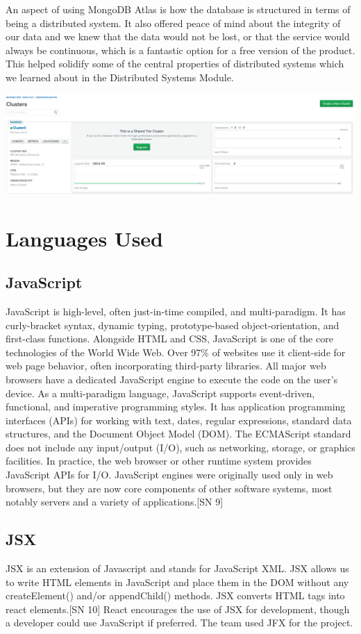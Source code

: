 An aspect of using MongoDB Atlas is how the database is structured in terms of being a distributed system. It also offered peace of mind about the integrity of our data and we knew that the data would not be lost, or that the service would always be continuous, which is a fantastic option for a free version of the product. 
This helped solidify  some of the central properties of distributed systems which we learned about in the Distributed Systems Module.
\begin{center}    
      \includegraphics[scale=0.5]{img/clusterDB.PNG}
\end{center}

\section{Languages Used}
\subsection{JavaScript}
JavaScript is high-level, often just-in-time compiled, and multi-paradigm. It has curly-bracket syntax, dynamic typing, prototype-based object-orientation, and first-class functions. 
Alongside HTML and CSS, JavaScript is one of the core technologies of the World Wide Web. Over 97\% of websites use it client-side for web page behavior, often incorporating third-party libraries. All major web browsers have a dedicated JavaScript engine to execute the code on the user's device. 
As a multi-paradigm language, JavaScript supports event-driven, functional, and imperative programming styles. It has application programming interfaces (APIs) for working with text, dates, regular expressions, standard data structures, and the Document Object Model (DOM).
The ECMAScript standard does not include any input/output (I/O), such as networking, storage, or graphics facilities. In practice, the web browser or other runtime system provides JavaScript APIs for I/O.
JavaScript engines were originally used only in web browsers, but they are now core components of other software systems, most notably servers and a variety of applications.[SN 9]
\subsection{JSX}
JSX is an extension of Javascript and stands for JavaScript XML.
JSX allows us to write HTML elements in JavaScript and place them in the DOM without any createElement()  and/or appendChild() methods. JSX converts HTML tags into react elements.[SN 10] 
React encourages the use of JSX for development, though a developer could use JavaScript if preferred.
The team used JFX for the project.

